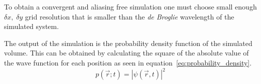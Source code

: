 To obtain a convergent and aliasing free simulation one must choose small enough $\delta{}x,\; \delta{}y$ grid resolution that is smaller than the \textit{de Broglie} wavelength of the simulated system.

The output of the simulation is the probability density function of the simulated volume.
This can be obtained by calculating the square of the absolute value of the wave function for each position as seen in equation~\ref{eq:probability_density}.
\begin{equation}
	\label{eq:probability_density}
	p(\vec{r}; t) = |\psi(\vec{r}, t)|^2
\end{equation}


